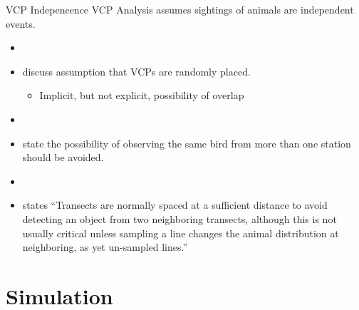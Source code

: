 \documentclass{beamer}
\begin{document}
\begin{frame}{VCP Indepencence}
	VCP Analysis assumes sightings of animals are independent events.
	\begin{itemize}
	\item[]
	\item \textcite{ramsey1979,buckland1987,thompson2012} discuss assumption that VCPs are randomly placed.
	\begin{itemize}
	\item Implicit, but not explicit, possibility of overlap
	\end{itemize}
	\item[]
	\item \textcite{reynolds1980} state the possibility of observing the same bird from more than one station should be avoided.
	\item[]
	\item \textcite{buckland2001} states ``Transects are normally spaced at a sufficient distance to avoid detecting an object from two neighboring transects, although this is not usually critical unless sampling a line changes the animal distribution at neighboring, as yet un-sampled lines.''
	\end{itemize}
	
\end{frame}

\section{Simulation}
\end{document}
